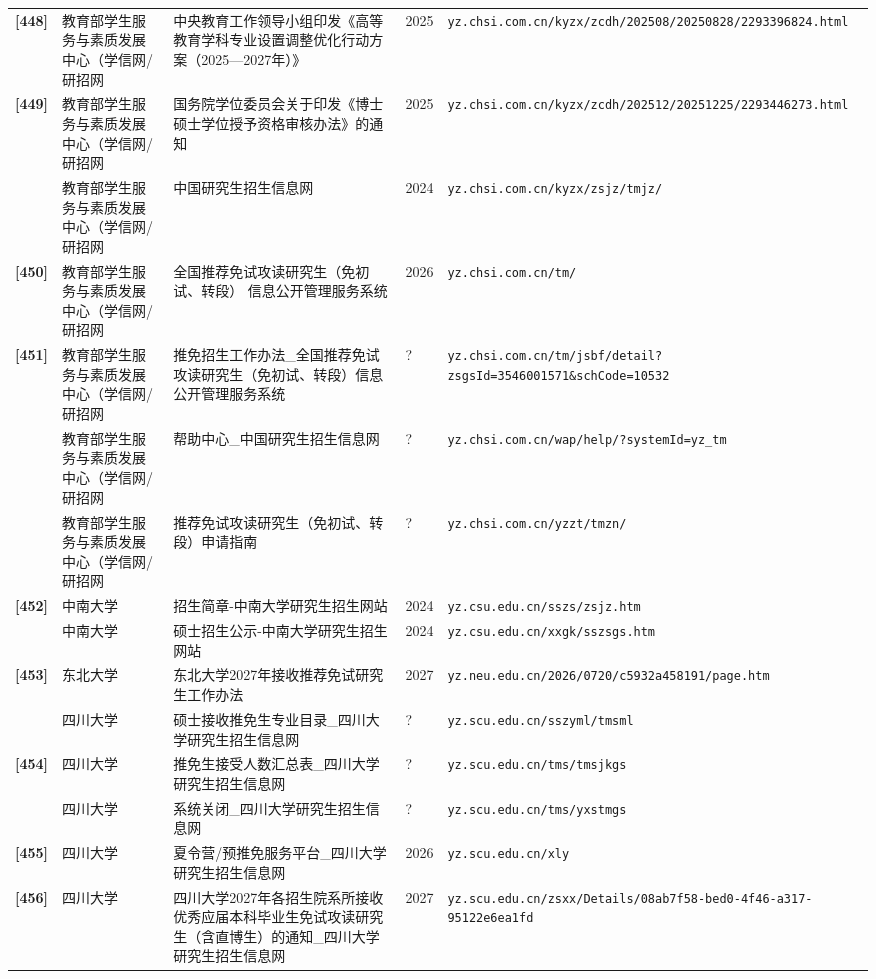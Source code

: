 {\begin{longtable}{@{}p{1.15cm}p{2.9cm}p{6.3cm}p{0.85cm}p{5.0cm}@{}}
\textbf{[448]} & 教育部学生服务与素质发展中心（学信网/研招网 & 中央教育工作领导小组印发《高等教育学科专业设置调整优化行动方案（2025—2027年）》 & 2025 & \texttt{yz.chsi.com.cn/kyzx/zcdh/202508/20250828/2293396824.html} \\
\textbf{[449]} & 教育部学生服务与素质发展中心（学信网/研招网 & 国务院学位委员会关于印发《博士硕士学位授予资格审核办法》的通知 & 2025 & \texttt{yz.chsi.com.cn/kyzx/zcdh/202512/20251225/2293446273.html} \\
[0] & 教育部学生服务与素质发展中心（学信网/研招网 & 中国研究生招生信息网 & 2024 & \texttt{yz.chsi.com.cn/kyzx/zsjz/tmjz/} \\
\textbf{[450]} & 教育部学生服务与素质发展中心（学信网/研招网 & 全国推荐免试攻读研究生（免初试、转段）
信息公开管理服务系统 & 2026 & \texttt{yz.chsi.com.cn/tm/} \\
\textbf{[451]} & 教育部学生服务与素质发展中心（学信网/研招网 & 推免招生工作办法\_全国推荐免试攻读研究生（免初试、转段）信息公开管理服务系统 & ? & \texttt{yz.chsi.com.cn/tm/jsbf/detail?zsgsId=3546001571\&schCode=10532} \\
[0] & 教育部学生服务与素质发展中心（学信网/研招网 & 帮助中心\_中国研究生招生信息网 & ? & \texttt{yz.chsi.com.cn/wap/help/?systemId=yz\_tm} \\
[0] & 教育部学生服务与素质发展中心（学信网/研招网 & 推荐免试攻读研究生（免初试、转段）申请指南 & ? & \texttt{yz.chsi.com.cn/yzzt/tmzn/} \\
\textbf{[452]} & 中南大学 & 招生简章-中南大学研究生招生网站 & 2024 & \texttt{yz.csu.edu.cn/sszs/zsjz.htm} \\
[0] & 中南大学 & 硕士招生公示-中南大学研究生招生网站 & 2024 & \texttt{yz.csu.edu.cn/xxgk/sszsgs.htm} \\
\textbf{[453]} & 东北大学 & 东北大学2027年接收推荐免试研究生工作办法 & 2027 & \texttt{yz.neu.edu.cn/2026/0720/c5932a458191/page.htm} \\
[0] & 四川大学 & 硕士接收推免生专业目录\_四川大学研究生招生信息网 & ? & \texttt{yz.scu.edu.cn/sszyml/tmsml} \\
\textbf{[454]} & 四川大学 & 推免生接受人数汇总表\_四川大学研究生招生信息网 & ? & \texttt{yz.scu.edu.cn/tms/tmsjkgs} \\
[0] & 四川大学 & 系统关闭\_四川大学研究生招生信息网 & ? & \texttt{yz.scu.edu.cn/tms/yxstmgs} \\
\textbf{[455]} & 四川大学 & 夏令营/预推免服务平台\_四川大学研究生招生信息网 & 2026 & \texttt{yz.scu.edu.cn/xly} \\
\textbf{[456]} & 四川大学 & 四川大学2027年各招生院系所接收优秀应届本科毕业生免试攻读研究生（含直博生）的通知\_四川大学研究生招生信息网 & 2027 & \texttt{yz.scu.edu.cn/zsxx/Details/08ab7f58-bed0-4f46-a317-95122e6ea1fd} \\

\end{longtable}}
